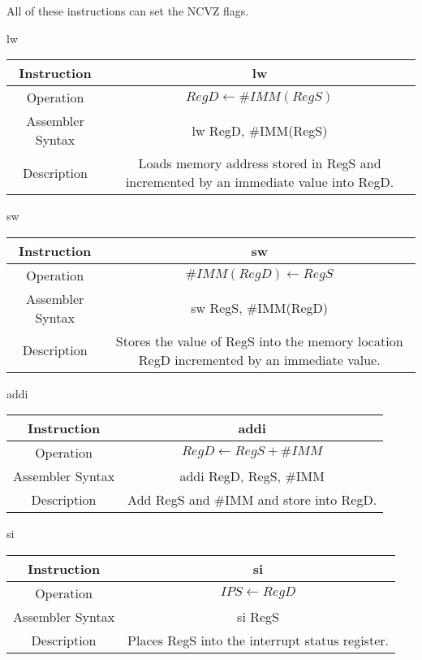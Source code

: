 \documentclass[]{article}
\begin{document}
\noindent All of these instructions can set the NCVZ flags.

lw\\
\begin{tabularx}{\textwidth}{c|c}\hline
	Instruction & lw\\\hline
	Operation & $RegD \leftarrow \#IMM(RegS)$\\\hline
	Assembler Syntax & lw RegD, \#IMM(RegS)\\\hline
	Description & Loads memory address stored in RegS and incremented by an immediate value into RegD.\\\hline
\end{tabularx}\vspace{1.5cm}

sw\\
\begin{tabularx}{\textwidth}{c|c}\hline
	Instruction & sw\\\hline
	Operation & $\#IMM(RegD) \leftarrow RegS$\\\hline
	Assembler Syntax & sw RegS, \#IMM(RegD)\\\hline
	Description & Stores the value of RegS into the memory location RegD incremented by an immediate value.\\\hline
\end{tabularx}\vspace{1.5cm}

addi\\
\begin{tabularx}{\textwidth}{c|c}\hline
	Instruction & addi\\\hline
	Operation & $RegD \leftarrow RegS + \#IMM$\\\hline
	Assembler Syntax & addi RegD, RegS, \#IMM\\\hline
	Description & Add RegS and \#IMM and store into RegD.\\\hline
\end{tabularx}\vspace{1.5cm}

si\\
\begin{tabularx}{\textwidth}{c|c}\hline
	Instruction & si\\\hline
	Operation & $IPS \leftarrow RegD$\\\hline
	Assembler Syntax & si RegS\\\hline
	Description & Places RegS into the interrupt status register.\\\hline
\end{tabularx}\vspace{1.5cm}
\end{document}
